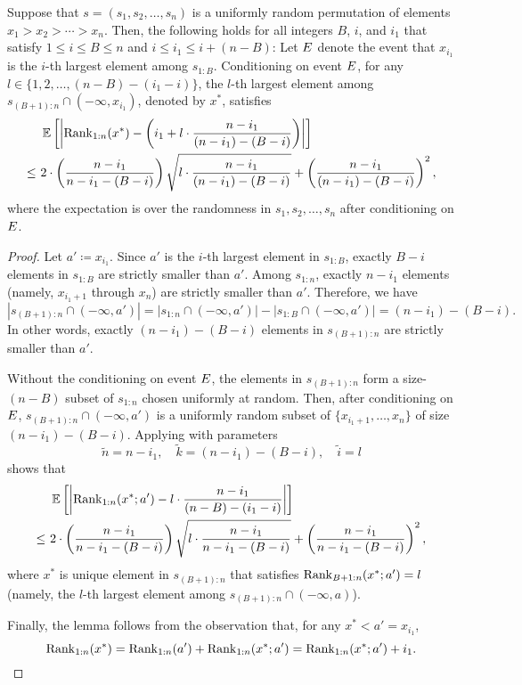 \begin{lemma}\label{lemma:rank-in-second-half-to-overall}
    Suppose that $s = (s_1, s_2, \ldots, s_n)$ is a uniformly random permutation of elements $x_1 > x_2 > \cdots > x_n$. Then, the following holds for all integers $B$, $i$, and $i_1$ that satisfy $1 \le i \le B \le n$ and $i \le i_1 \le i + (n - B)$: Let $E$ denote the event that $x_{i_1}$ is the $i$-th largest element among $s_{1:B}$. Conditioning on event $E$, for any $l \in \{1, 2, \ldots, (n - B) - (i_1 - i)\}$, the $l$-th largest element among $s_{(B+1):n} \cap (-\infty, x_{i_1})$, denoted by $x^*$, satisfies
    \begin{align*}
        &~\operatorname*{\mathbb{E}}_{}\left[\left|\mathrm{Rank}_{{1:n}}(x^*) - \left(i_1+l\cdot \frac{n-i_1}{(n - i_1) - (B-i)}\right)\right|\right]\\
    \le &~2 \cdot \left(\frac{n-i_1}{n-i_1-(B-i)}\right)\sqrt{l\cdot \frac{n-i_1}{(n-i_1)-(B-i)}} + \left(\frac{n-i_1}{(n-i_1)-(B-i)}\right)^2,
    \end{align*}
    where the expectation is over the randomness in $s_1, s_2, \ldots, s_n$ after conditioning on $E$.
\end{lemma}
\begin{proof}
    Let $a' \coloneqq x_{i_1}$. Since $a'$ is the $i$-th largest element in $s_{1:B}$, exactly $B - i$ elements in $s_{1:B}$ are strictly smaller than $a'$. Among $s_{1:n}$, exactly $n - i_1$ elements (namely, $x_{i_1 + 1}$ through $x_n$) are strictly smaller than $a'$. Therefore, we have
    \[
        |s_{(B+1):n} \cap (-\infty, a')|
    =   |s_{1:n} \cap (-\infty, a')| - |s_{1:B} \cap (-\infty, a')|
    =   (n - i_1) - (B - i).
    \]
    In other words, exactly $(n - i_1) - (B - i)$ elements in $s_{(B+1):n}$ are strictly smaller than $a'$.

    Without the conditioning on event $E$, the elements in $s_{(B + 1): n}$ form a size-$(n-B)$ subset of $s_{1:n}$ chosen uniformly at random. Then, after conditioning on $E$, $s_{(B+1):n} \cap (-\infty, a')$ is a uniformly random subset of $\{x_{i_1+1}, \ldots, x_n\}$ of size $(n - i_1) - (B - i)$. Applying  with parameters
    \[
        \tilde n = n - i_1, \quad \tilde k = (n - i_1) - (B - i), \quad \tilde i = l
    \]
    shows that
    \begin{align*}
        &~\operatorname*{\mathbb{E}}_{}\left[\left|\mathrm{Rank}_{{1:n}}(x^*; a') - l\cdot \frac{n-i_1}{(n-B)-(i_1-i)}\right|\right]\\
    \le &~2 \cdot \left(\frac{n-i_1}{n-i_1-(B-i)}\right)\sqrt{l\cdot \frac{n-i_1}{n-i_1-(B-i)}} + \left(\frac{n-i_1}{n-i_1-(B-i)}\right)^2,
    \end{align*}
    where $x^*$ is unique element in $s_{(B+1):n}$ that satisfies $\mathrm{Rank}_{B+1:n}(x^*; a') = l$ (namely, the $l$-th largest element among $s_{(B+1):n} \cap (-\infty, a)$).
   
    Finally, the lemma follows from the observation that, for any $x^* < a' = x_{i_1}$,
    \[
        \mathrm{Rank}_{1:n}(x^*)
    =   \mathrm{Rank}_{1:n}(a') + \mathrm{Rank}_{1:n}(x^*; a')
    =   \mathrm{Rank}_{1:n}(x^*; a') + i_1.
    \]
\end{proof}

